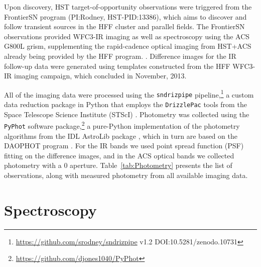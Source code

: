 Upon discovery, HST target-of-opportunity observations were triggered
from the FrontierSN program (PI:Rodney, HST-PID:13386), which aims to
discover and follow transient sources in the HFF cluster and parallel
fields. The FrontierSN observations provided WFC3-IR imaging as well
as spectroscopy using the ACS G800L grism, supplementing the
rapid-cadence optical imaging from HST+ACS already being provided by
the HFF program. .
Difference images for the IR follow-up data were generated using
templates constructed from the HFF WFC3-IR imaging campaign, which
concluded in November, 2013.

All of the imaging data were processed using the {\tt sndrizpipe}
pipeline,\footnote{\url{https://github.com/srodney/sndrizpipe} v1.2
DOI:10.5281/zenodo.10731} a custom data reduction package in Python
that employs the {\tt DrizzlePac} tools from the Space Telescope
Science Institute (STScI) \citep{Fruchter:2010}.  Photometry was
collected using the {\tt PyPhot} software
package,\footnote{\url{https://github.com/djones1040/PyPhot}} a
pure-Python implementation of the photometry algorithms from the IDL
AstroLib package \citep{Landsman:1993}, which in turn are based on the
DAOPHOT program \citep{Stetson:1987}.  For the IR bands we used point
spread function (PSF) fitting on the difference images, and in the ACS
optical bands we collected photometry with a
0 aperture. Table~\ref{tab:Photometry} presents the list of
observations, along with measured photometry from all available
imaging data.
 


\section{Spectroscopy}
\label{sec:Spectroscopy}

